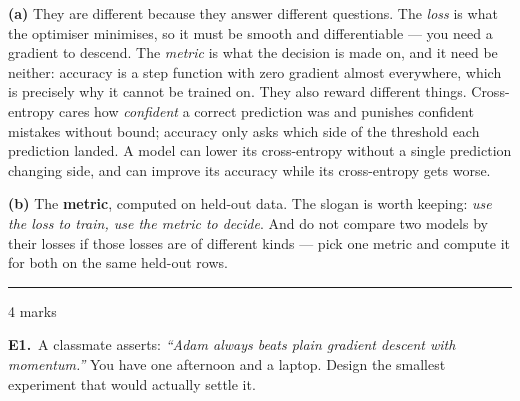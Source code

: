 \documentclass[10pt,a4paper]{article}
\newcommand{\parthead}[2]{\vspace{2pt}\noindent\rule{\linewidth}{0.4pt}\par\vspace{2pt}%
  \noindent{\bfseries Part #1}\hfill{\small #2}\par\vspace{1pt}}
\begin{document}
\textbf{(a)} They are different because they answer different questions. The \emph{loss} is what the optimiser minimises, so it must be smooth and differentiable --- you need a gradient to descend. The \emph{metric} is what the decision is made on, and it need be neither: accuracy is a step function with zero gradient almost everywhere, which is precisely why it cannot be trained on. They also reward different things. Cross-entropy cares how \emph{confident} a correct prediction was and punishes confident mistakes without bound; accuracy only asks which side of the threshold each prediction landed. A model can lower its cross-entropy without a single prediction changing side, and can improve its accuracy while its cross-entropy gets worse.\par\vspace{1mm}\textbf{(b)} The \textbf{metric}, computed on held-out data. The slogan is worth keeping: \emph{use the loss to train, use the metric to decide}. And do not compare two models by their losses if those losses are of different kinds --- pick one metric and compute it for both on the same held-out rows.

\newpage

\parthead{E --- Reasoning}{4 marks}

\textbf{E1.}\ A classmate asserts: \emph{``Adam always beats plain gradient descent with momentum.''} You have one
afternoon and a laptop. Design the smallest experiment that would actually settle it.

\vspace{4pt}
\end{document}
